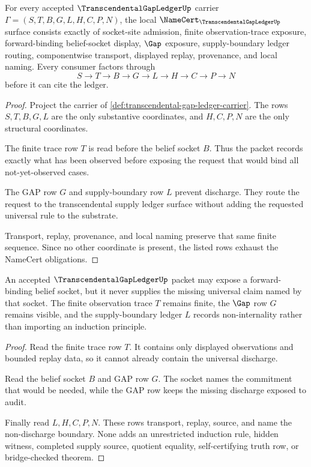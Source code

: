 \begin{theorem}
\label{thm:transcendental-gap-ledger-namecert-obligations}
For every accepted $\TranscendentalGapLedgerUp$ carrier $\Gamma=(S,T,B,G,L,H,C,P,N)$, the local $\NameCert_{\TranscendentalGapLedgerUp}$ surface consists exactly of socket-site admission, finite observation-trace exposure, forward-binding belief-socket display, $\Gap$ exposure, supply-boundary ledger routing, componentwise transport, displayed replay, provenance, and local naming. Every consumer factors through
$$
S \to T \to B \to G \to L \to H \to C \to P \to N
$$
before it can cite the ledger.
\end{theorem}
\begin{proof}
Project the carrier of \autoref{def:transcendental-gap-ledger-carrier}. The rows $S,T,B,G,L$ are the only substantive coordinates, and $H,C,P,N$ are the only structural coordinates.

The finite trace row $T$ is read before the belief socket $B$. Thus the packet records exactly what has been observed before exposing the request that would bind all not-yet-observed cases.

The GAP row $G$ and supply-boundary row $L$ prevent discharge. They route the request to the transcendental supply ledger surface without adding the requested universal rule to the substrate.

Transport, replay, provenance, and local naming preserve that same finite sequence. Since no other coordinate is present, the listed rows exhaust the NameCert obligations.
\end{proof}

\begin{theorem}
\label{thm:transcendental-gap-ledger-nondischarge}
An accepted $\TranscendentalGapLedgerUp$ packet may expose a forward-binding belief socket, but it never supplies the missing universal claim named by that socket. The finite observation trace $T$ remains finite, the $\Gap$ row $G$ remains visible, and the supply-boundary ledger $L$ records non-internality rather than importing an induction principle.
\end{theorem}
\begin{proof}
Read the finite trace row $T$. It contains only displayed observations and bounded replay data, so it cannot already contain the universal discharge.

Read the belief socket $B$ and GAP row $G$. The socket names the commitment that would be needed, while the GAP row keeps the missing discharge exposed to audit.

Finally read $L,H,C,P,N$. These rows transport, replay, source, and name the non-discharge boundary. None adds an unrestricted induction rule, hidden witness, completed supply source, quotient equality, self-certifying truth row, or bridge-checked theorem.
\end{proof}

